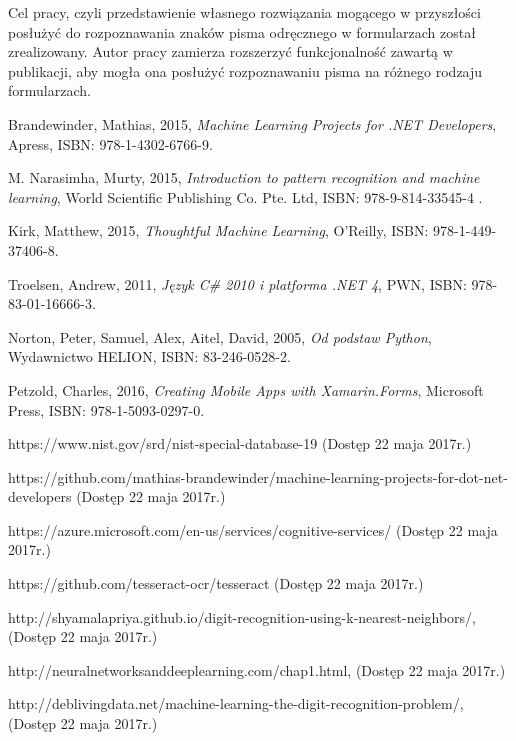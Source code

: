 \documentclass[brudnopis]{xmgr}
\begin{document}
Cel pracy, czyli przedstawienie własnego rozwiązania mogącego w przyszłości posłużyć do rozpoznawania znaków pisma odręcznego w formularzach został zrealizowany. Autor pracy zamierza rozszerzyć funkcjonalność zawartą w publikacji, aby mogła ona posłużyć rozpoznawaniu pisma na różnego rodzaju formularzach.




\begin{thebibliography}{9}

  Brandewinder,
  Mathias,
  2015,
  \emph{Machine Learning Projects for .NET Developers},
  Apress,
  ISBN: 978-1-4302-6766-9.

  M. Narasimha,
  Murty,
  2015,
  \emph{Introduction to pattern recognition and machine learning},
  World Scientific Publishing Co. Pte. Ltd,
  ISBN: 978-9-814-33545-4 .  

  Kirk,
  Matthew,
  2015,
  \emph{Thoughtful Machine Learning},
  O'Reilly,
  ISBN: 978-1-449-37406-8.
  
  Troelsen,
  Andrew,
  2011,
  \emph{Język C\# 2010 i platforma .NET 4},
  PWN,
  ISBN: 978-83-01-16666-3.
  
  Norton,
  Peter,
  Samuel,
  Alex,
  Aitel,
  David,
  2005,
  \emph{Od podstaw Python},
  Wydawnictwo HELION,
  ISBN: 83-246-0528-2.  
  
  Petzold,
  Charles,
  2016,
  \emph{Creating Mobile Apps with Xamarin.Forms},
  Microsoft Press,
  ISBN: 978-1-5093-0297-0.  

  https://www.nist.gov/srd/nist-special-database-19
  (Dostęp 22 maja 2017r.)

  https://github.com/mathias-brandewinder/machine-learning-projects-for-dot-net-developers
  (Dostęp 22 maja 2017r.)
  
  https://azure.microsoft.com/en-us/services/cognitive-services/
  (Dostęp 22 maja 2017r.)

  https://github.com/tesseract-ocr/tesseract
  (Dostęp 22 maja 2017r.)
  
  http://shyamalapriya.github.io/digit-recognition-using-k-nearest-neighbors/,
  (Dostęp 22 maja 2017r.)

  http://neuralnetworksanddeeplearning.com/chap1.html,
  (Dostęp 22 maja 2017r.)

  http://deblivingdata.net/machine-learning-the-digit-recognition-problem/,
  (Dostęp 22 maja 2017r.)


\end{thebibliography}
\end{document}
